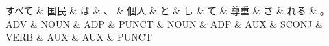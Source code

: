 \documentclass[tikz,border=5pt]{standalone}
\begin{document}
\normalsize
\begin{dependency}[edge unit distance=12.0pt]
    \begin{deptext}[column sep=1em]
        すべて \& 国民 \& は \& 、 \& 個人 \& と \& し \& て \& 尊重 \& さ \& れる \& 。\\
        ADV \& NOUN \& ADP \& PUNCT \& NOUN \& ADP \& AUX \& SCONJ \& VERB \& AUX \& AUX \& PUNCT\\
    \end{deptext}
\end{dependency}
\end{document}
